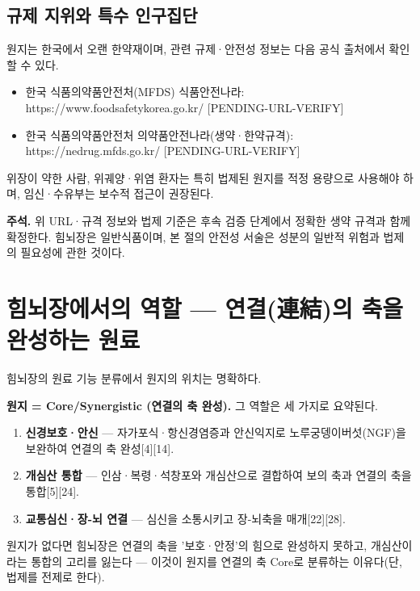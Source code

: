 \documentclass[11pt,oneside]{book}
\newenvironment{authnote}
  {\par\smallskip\begingroup\leftskip=7mm\rightskip=5mm\small\color{muted}\noindent\ignorespaces}
  {\par\endgroup\smallskip}
\begin{document}
\subsection{규제 지위와 특수 인구집단}
원지는 한국에서 오랜 한약재이며, 관련 규제·안전성 정보는 다음 공식 출처에서 확인할 수 있다.

\begin{itemize}[leftmargin=6mm,itemsep=1pt,topsep=2pt]
  \item 한국 식품의약품안전처(MFDS) 식품안전나라: https://www.foodsafetykorea.go.kr/ [PENDING-URL-VERIFY]
  \item 한국 식품의약품안전처 의약품안전나라(생약·한약규격): https://nedrug.mfds.go.kr/ [PENDING-URL-VERIFY]
\end{itemize}
위장이 약한 사람, 위궤양·위염 환자는 특히 법제된 원지를 적정 용량으로 사용해야 하며, 임신·수유부는 보수적 접근이 권장된다.

\begin{authnote}\textbf{주석.} 위 URL·규격 정보와 법제 기준은 후속 검증 단계에서 정확한 생약 규격과 함께 확정한다. 힘뇌장은 일반식품이며, 본 절의 안전성 서술은 성분의 일반적 위험과 법제의 필요성에 관한 것이다.\end{authnote}
\section{힘뇌장에서의 역할 — 연결(連結)의 축을 완성하는 원료}
힘뇌장의 원료 기능 분류에서 원지의 위치는 명확하다.

\vspace{2pt}\vspace{3pt}

\textbf{원지 = Core/Synergistic (연결의 축 완성).} 그 역할은 세 가지로 요약된다.

\begin{enumerate}[leftmargin=6mm,itemsep=1pt,topsep=2pt]
  \item \textbf{신경보호·안신} — 자가포식·항신경염증과 안신익지로 노루궁뎅이버섯(NGF)을 보완하여 연결의 축 완성[4][14].
  \item \textbf{개심산 통합} — 인삼·복령·석창포와 개심산으로 결합하여 보의 축과 연결의 축을 통합[5][24].
  \item \textbf{교통심신·장-뇌 연결} — 심신을 소통시키고 장-뇌축을 매개[22][28].
\end{enumerate}
원지가 없다면 힘뇌장은 연결의 축을 '보호·안정'의 힘으로 완성하지 못하고, 개심산이라는 통합의 고리를 잃는다 — 이것이 원지를 연결의 축 Core로 분류하는 이유다(단, 법제를 전제로 한다).
\end{document}
